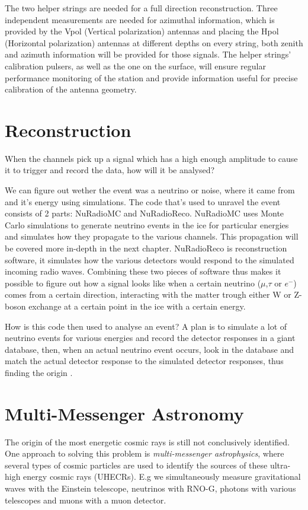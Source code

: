 The two helper strings are needed for a full direction reconstruction.
Three independent measurements are needed for azimuthal information, which is
provided by the Vpol (Vertical polarization) antennas and placing the Hpol
(Horizontal polarization) antennas at different depths on every string, both
zenith and azimuth information will be provided for those signals. The helper
strings' calibration pulsers, as well as the one on the surface, will ensure
regular performance monitoring of the station and provide information
useful for precise calibration of the antenna geometry.

\section{Reconstruction}
When the channels pick up a signal which has a high enough amplitude to
cause it to trigger and record the data, how will it be analysed?

We can figure out wether the event was a neutrino or noise, where it came from
and it's energy using simulations. The code that's used to unravel the event
consists of 2 parts: NuRadioMC\cite{Glaser_2020} and
NuRadioReco\cite{Glaser_2019}. NuRadioMC uses Monte Carlo simulations to
generate neutrino events in the ice for particular energies and simulates how
they propagate to the various channels. This propagation will be covered more
in-depth in the next chapter.  NuRadioReco is reconstruction software, it
simulates how the various detectors would respond to the simulated incoming
radio waves.  Combining these two pieces of software thus makes it possible to
figure out how a signal looks like when a certain neutrino ($\mu$,$\tau$ or
$e^-$) comes from a certain direction, interacting with the matter trough
either W or Z-boson exchange at a certain point in the ice with a certain
energy. 

How is this code then used to analyse an event?
A plan \cite{lookuptable} is to simulate a lot of neutrino events for various energies and
record the detector responses in a giant database, then, when an actual neutrino
event occurs, look in the database and match the actual
detector response to the simulated detector responses, thus finding the origin .

\section{Multi-Messenger Astronomy}
The origin of the most energetic cosmic rays is still not conclusively
identified. One approach to solving this problem is \textit{multi-messenger
astrophysics}, where several types of cosmic particles are used to identify the
sources of these ultra-high energy cosmic rays (UHECRs). E.g we simultaneously
measure gravitational waves with the Einstein telescope, neutrinos with RNO-G,
photons with various telescopes and muons with a muon detector.

